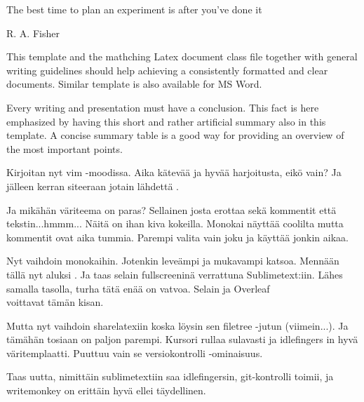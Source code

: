 \documentclass[12pt,a4paper,finnish]{tutthesis}
\begin{document}
\epigraph{The best time to plan an experiment is after you’ve done it}{R. A. Fisher}

This template and the mathching Latex document class file together
with general writing guidelines should help achieving a consistently
formatted and clear documents. Similar template is also available for
MS Word.

Every writing and presentation must have a conclusion. This fact is
here emphasized by having this short and rather artificial summary
also in this template. A concise summary table is a good way for
providing an overview of the most important points.

Kirjoitan nyt vim -moodissa. Aika kätevää ja hyvää harjoitusta, eikö vain?
Ja jälleen kerran siteeraan jotain lähdettä \parencite{rubberwheel}.

Ja mikähän väriteema on paras? Sellainen josta erottaa sekä kommentit että tekstin...hmmm...
Näitä on ihan kiva kokeilla. Monokai näyttää coolilta mutta kommentit ovat
aika tummia. Parempi valita vain joku ja käyttää jonkin aikaa.

Nyt vaihdoin monokaihin. Jotenkin leveämpi ja mukavampi katsoa. Mennään
tällä nyt aluksi \parencite{wang2010143}. Ja taas selain fullscreeninä verrattuna
Sublimetext:iin. Lähes samalla tasolla, turha tätä enää on vatvoa. Selain ja Overleaf \\ voittavat
tämän kisan.

Mutta nyt vaihdoin sharelatexiin koska löysin sen filetree -jutun (viimein...).
Ja tämähän tosiaan on paljon parempi. Kursori rullaa sulavasti ja idlefingers in hyvä
väritemplaatti. Puuttuu vain se versiokontrolli -ominaisuus.

Taas uutta, nimittäin sublimetextiin saa idlefingersin, git-kontrolli
toimii, ja writemonkey on erittäin hyvä ellei täydellinen.



\newpage

\renewcommand{\bibname}{Lähteet}         %
\end{document}
